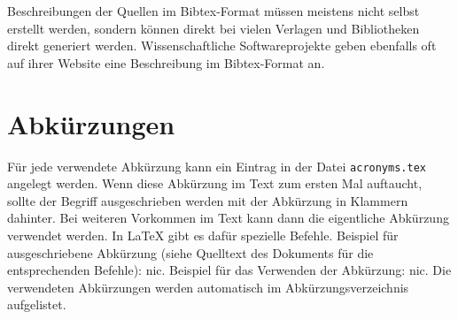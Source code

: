 Beschreibungen der Quellen im Bibtex-Format müssen meistens nicht selbst erstellt werden, sondern können direkt bei vielen Verlagen und Bibliotheken direkt generiert werden. Wissenschaftliche Softwareprojekte geben ebenfalls oft auf ihrer Website eine Beschreibung im Bibtex-Format an.



\section{Abkürzungen}
Für jede verwendete Abkürzung kann ein Eintrag in der Datei \texttt{acronyms.tex} angelegt werden. Wenn diese Abkürzung im Text zum ersten Mal auftaucht, sollte der Begriff ausgeschrieben werden mit der Abkürzung in Klammern dahinter. Bei weiteren Vorkommen im Text kann dann die eigentliche Abkürzung verwendet werden. In \LaTeX{} gibt es dafür spezielle Befehle. Beispiel für ausgeschriebene Abkürzung (siehe Quelltext des Dokuments für die entsprechenden Befehle): \acrfull{nic}. Beispiel für das Verwenden der Abkürzung: \acrshort{nic}. Die verwendeten Abkürzungen werden automatisch im Abkürzungsverzeichnis aufgelistet.
